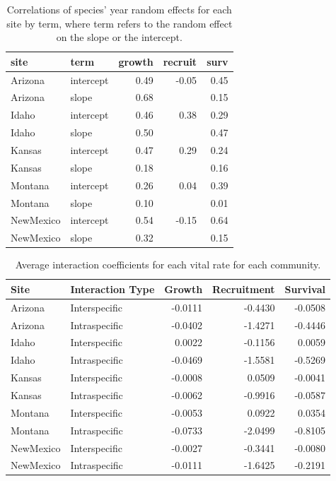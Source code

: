 \documentclass[12pt,]{article}
\begin{document}
\newpage{}

\begin{table}[ht]
\centering
\caption{Correlations of species' year random effects for each site by term, where term refers to the random effect on the slope or the intercept.} 
\begin{tabular}{llrrr}
  \hline
site & term & growth & recruit & surv \\ 
  \hline
Arizona & intercept & 0.49 & -0.05 & 0.45 \\ 
  Arizona & slope & 0.68 &  & 0.15 \\ 
  Idaho & intercept & 0.46 & 0.38 & 0.29 \\ 
  Idaho & slope & 0.50 &  & 0.47 \\ 
  Kansas & intercept & 0.47 & 0.29 & 0.24 \\ 
  Kansas & slope & 0.18 &  & 0.16 \\ 
  Montana & intercept & 0.26 & 0.04 & 0.39 \\ 
  Montana & slope & 0.10 &  & 0.01 \\ 
  NewMexico & intercept & 0.54 & -0.15 & 0.64 \\ 
  NewMexico & slope & 0.32 &  & 0.15 \\ 
   \hline
\end{tabular}
\end{table}

\newpage{}

\begin{table}[ht]
\centering
\caption{Average interaction coefficients for each vital rate for each community.} 
\begin{tabular}{llrrr}
  \hline
Site & Interaction Type & Growth & Recruitment & Survival \\ 
  \hline
Arizona & Interspecific & -0.0111 & -0.4430 & -0.0508 \\ 
  Arizona & Intraspecific & -0.0402 & -1.4271 & -0.4446 \\ 
  Idaho & Interspecific & 0.0022 & -0.1156 & 0.0059 \\ 
  Idaho & Intraspecific & -0.0469 & -1.5581 & -0.5269 \\ 
  Kansas & Interspecific & -0.0008 & 0.0509 & -0.0041 \\ 
  Kansas & Intraspecific & -0.0062 & -0.9916 & -0.0587 \\ 
  Montana & Interspecific & -0.0053 & 0.0922 & 0.0354 \\ 
  Montana & Intraspecific & -0.0733 & -2.0499 & -0.8105 \\ 
  NewMexico & Interspecific & -0.0027 & -0.3441 & -0.0080 \\ 
  NewMexico & Intraspecific & -0.0111 & -1.6425 & -0.2191 \\ 
   \hline
\end{tabular}
\end{table}
\end{document}
